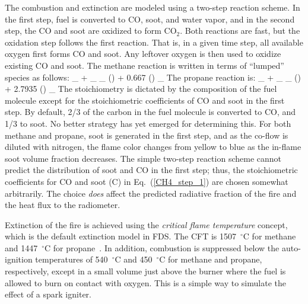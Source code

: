 The combustion and extinction are modeled using a two-step reaction scheme. In the first step, fuel is converted to CO, soot, and water vapor, and in the second step, the CO and soot are oxidized to form CO$_2$. Both reactions are fast, but the oxidation step follows the first reaction. That is, in a given time step, all available oxygen first forms CO and soot. Any leftover oxygen is then used to oxidize existing CO and soot. The methane reaction is written in terms of ``lumped'' species as follows:
\be
{}_ \; +  \; _ \longrightarrow
{}_ \label{CH4_step_1}
\ee
\be
() + 0.667 \; () \longrightarrow  {}_
\ee
The propane reaction is:
\be
{}_ \; +  \; _ \longrightarrow
{}_
\ee
\be
() + 2.7935 \; () \longrightarrow  {}_
\ee
The stoichiometry is dictated by the composition of the fuel molecule except for the stoichiometric coefficients of CO and soot in the first step. By default, 2/3 of the carbon in the fuel molecule is converted to CO, and 1/3 to soot. No better strategy has yet emerged for determining this. For both methane and propane, soot is generated in the first step, and as the co-flow is diluted with nitrogen, the flame color changes from yellow to blue as the in-flame soot volume fraction decreases. The simple two-step reaction scheme cannot predict the distribution of soot and CO in the first step; thus, the stoichiometric coefficients for CO and soot (C) in Eq.~(\ref{CH4_step_1}) are chosen somewhat arbitrarily. The choice {\em does} affect the predicted radiative fraction of the fire and the heat flux to the radiometer.

Extinction of the fire is achieved using the {\em critical flame temperature} concept, which is the default extinction model in FDS. The CFT is 1507~$^\circ$C for methane and 1447~$^\circ$C for propane~\cite{SFPE:Beyler}. In addition, combustion is suppressed below the auto-ignition temperatures of 540~$^\circ$C and 450~$^\circ$C for methane and propane, respectively, except in a small volume just above the burner where the fuel is allowed to burn on contact with oxygen. This is a simple way to simulate the effect of a spark igniter.


